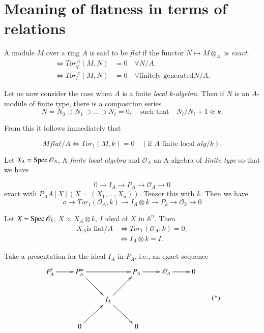 {\section{Meaning of flatness in terms of relations}\label{part1-sec3}

A module $M$ over a ring $A$ is said to be {\em flat} if the functor $N\mapsto M\otimes_{A}$ is {\em exact}.
\begin{align*}
\Leftrightarrow Tor_{q}^{A}(M, N)&=0\quad\forall N/A.\\
\Leftrightarrow Tor_{l}^{A}(M, N)&=0\quad \forall \text{finitely generated} N/A.
\end{align*}

Let us now consider the case when $A$ is  a finite {\em local} $k$-{\em algebra}. Then if $N$ is an $A$-module of finite type, there is a composition series
$$
N=N_{0}\supset N_{1}\supset\ldots\supset N_{\ell}=0,\quad \text{such that}\quad N_{i}/N_{i}+1\approx k.
$$

From this it follows immediately that

$$
M flat/A \Leftrightarrow Tor_{1}(M, k)=0\quad(\text{if $A$ finite local } alg/k).
$$

Let $X_{A}=\operatorname{Spec} \mathscr{O}_{A}$, A {\em finite local algebra} and $\mathscr{O}_{A}$ an A-algebra of {\em Iinite type} so that we have

$$
0\rightarrow I_{A}\rightarrow P_{A}\rightarrow \mathscr{O}_{A}\rightarrow 0
$$
exact with $P_{A}A[X] (X=(X_{1},\ldots,X_{n}))$. Tensor this with $k$. Then we have
$$
o\rightarrow Tor_1(\mathscr{O}_A, k)\rightarrow I_A \otimes k\rightarrow P_k\rightarrow \mathscr{O}_k\rightarrow 0 
$$\pageoriginale

Let $X=\operatorname{Spec} \mathscr{O}_k$, $X\approx X_A \otimes k$, $I$ ideal of $X$ in $\mathbb{A}^n$. Then
\begin{align*}
X_A \text{is flat}/A &\Leftrightarrow Tor_1(\mathscr{O}_A, k)=0,\\
&\Leftrightarrow I_A \otimes k=I.
\end{align*}

Take a presentation for the ideal $I_A$ in $P_A$, i.e., an exact sequence
\begin{equation*}
\vcenter{
\xymatrix{
P_A^\ell\ar[r] & P^{m}_{A}\ar[rr]\ar[dr] & & P_{A}\ar[r] & \mathscr{O}_{A}\ar[r] & 0\\
 & & I_{A}\ar[ur]\ar[dr] & & &\\
 & 0\ar[ur] & & 0 & &
}}\tag{*}
\end{equation*}

}
